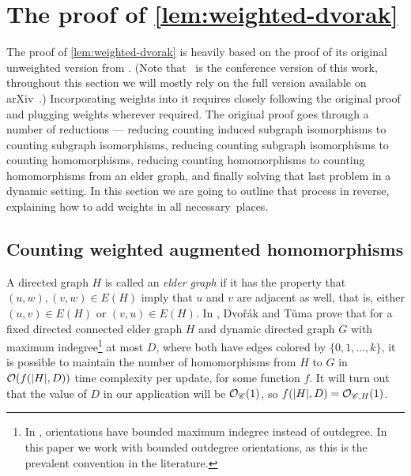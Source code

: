 \section{The proof of \cref{lem:weighted-dvorak}} \label{sec:app-weighted-dvorak}


The proof of \cref{lem:weighted-dvorak} is heavily based on the proof of its original unweighted version from \cite{DvorakTumaArxiv}. (Note that~\cite{DvorakT13} is the conference version of this work, throughout this section we will mostly rely on the full version available on arXiv~\cite{DvorakTumaArxiv}.) Incorporating weights into it requires closely following the original proof and plugging weights wherever required. The original proof goes through a number of reductions --- reducing counting induced subgraph isomorphisms to counting subgraph isomorphisms, reducing counting subgraph isomorphisms to counting homomorphisms, reducing counting homomorphisms to counting homomorphisms from an elder graph, and finally solving that last problem in a dynamic setting. In this section we are going to outline that process in reverse, explaining how to add weights in all necessary~places.

\subsection{Counting weighted augmented homomorphisms}
 
A directed graph $H$ is called an \textit{elder graph} if it has the property that $(u, w), (v, w) \in E(H)$ imply that $u$ and $v$ are adjacent as well, that is, either $(u, v) \in E(H)$ or $(v, u) \in E(H)$.
In \cite[Theorem~14]{DvorakTumaArxiv}, Dvo\v{r}\'ak and T\r{u}ma prove that for a fixed directed connected elder graph $H$ and dynamic directed graph $G$ with maximum indegree\footnote{In \cite{DvorakTumaArxiv}, orientations have bounded maximum indegree instead of outdegree. In this paper we work with bounded outdegree orientations, as this is the prevalent convention in the literature.} at most $D$, where both have edges colored by $\{0, 1, \ldots, k\}$, it is possible to maintain the number of homomorphisms from $H$ to $G$ in $\mathcal{O}(f(|H|, D))$ time complexity per update, for some function $f$. It will turn out that the value of $D$ in our application will be $\mathcal{O}_\mathscr C(1)$, so $f(|H|, D) = \mathcal{O}_{\mathscr C, H}(1)$. %

